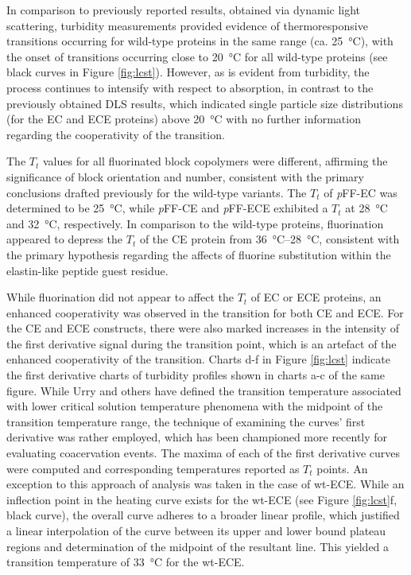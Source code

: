 \begin{refsection}
In comparison to previously reported results, obtained via dynamic light
scattering, turbidity measurements provided evidence of thermoresponsive
transitions occurring for wild-type proteins in the same range (ca.
\SI{25}{\celsius}), with the onset of transitions occurring close to
\SI{20}{\celsius} for all wild-type proteins (see black curves in Figure 
\ref{fig:lcst}). However, as is evident from turbidity, the process continues
to intensify with respect to absorption, in contrast to the previously obtained
DLS results, which indicated single particle size distributions (for the EC and
ECE proteins) above \SI{20}{\celsius} with no further information regarding the
cooperativity of the transition.

The ${T_t}$ values for all fluorinated block copolymers were different, affirming
the significance of block orientation and number, consistent with the primary
conclusions drafted previously for the wild-type
variants.\cite{Haghpanah2010,Haghpanah2009} The ${T_t}$ of \emph{p}FF-EC was determined
to be \SI{25}{\celsius}, while \emph{p}FF-CE and \emph{p}FF-ECE exhibited a ${T_t}$ at
\SI{28}{\celsius} and \SI{32}{\celsius}, respectively. In comparison to the
wild-type proteins, fluorination appeared to depress the ${T_t}$ of the CE
protein from \SIrange{36}{28}{\celsius}, consistent with the primary hypothesis
regarding the affects of fluorine substitution within the elastin-like peptide
guest residue.

While fluorination did not appear to affect the ${T_t}$ of EC or ECE proteins,
an enhanced cooperativity was observed in the transition for both CE and ECE.
For the CE and ECE constructs, there were also marked increases in the intensity
of the first derivative signal during the transition point, which is an artefact
of the enhanced cooperativity of the transition.  Charts d-f in Figure
\ref{fig:lcst} indicate the first derivative charts of turbidity profiles shown
in charts a-c of the same figure. While Urry and others have defined the
transition temperature associated with lower critical solution temperature
phenomena with the midpoint of the transition temperature
range,\cite{Urry1993,Nuhn2008} the technique of examining the curves' first
derivative was rather employed, which has been championed more recently for
evaluating coacervation
events.\cite{Furgeson2006,Liu2010b,Mackay2010a,Meyer2004} The maxima of each of
the first derivative curves were computed and corresponding temperatures
reported as ${T_t}$ points.  An exception to this approach of analysis was taken
in the case of wt-ECE. While an inflection point in the heating curve exists for
the wt-ECE (see Figure \ref{fig:lcst}f, black curve), the overall curve adheres
to a broader linear profile, which justified a linear interpolation of the curve
between its upper and lower bound plateau regions and determination of the
midpoint of the resultant line. This yielded a transition temperature of
\SI{33}{\celsius} for the wt-ECE.


\end{refsection}
